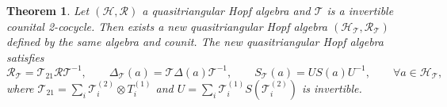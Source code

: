 \documentclass[reqno]{amsart}
\newtheorem{theorem}[formula]{Theorem}
\theoremstyle{definition}
\theoremstyle{remark}
\begin{document}
\begin{theorem}\label{theorem for new quasitriangular Hopf alg}
    Let $(\mathscr{H},\mathcal{R})$ a quasitriangular Hopf algebra and $\mathcal{T}$ is a invertible counital 2-cocycle. Then exists a new quasitriangular Hopf algebra $(\mathscr{H}_\mathcal{T}, \mathcal{R}_\mathcal{T})$ defined by the same algebra and counit. The new quasitriangular Hopf algebra satisfies
\begin{equation}\label{theorem 2.4}
        \mathcal{R}_\mathcal{T}=\mathcal{T}_{21} \mathcal{R} \mathcal{T}^{-1},\qquad \Delta_\mathcal{T}(a) = \mathcal{T} \Delta(a) \mathcal{T}^{-1}, \qquad S_\mathcal{T} (a)= US(a)U^{-1}, \qquad \forall a \in \mathscr{H}_\mathcal{T},
    \end{equation}
    where $\mathcal{T}_{21} =\sum\limits_i \mathcal{T}_i^{(2)}\otimes {T}_i^{(1)}$ and $U=\sum\limits_i \mathcal{T}_i^{(1)}S\left(\mathcal{T}_i^{(2)}\right)$ is invertible.
\end{theorem}
\end{document}
